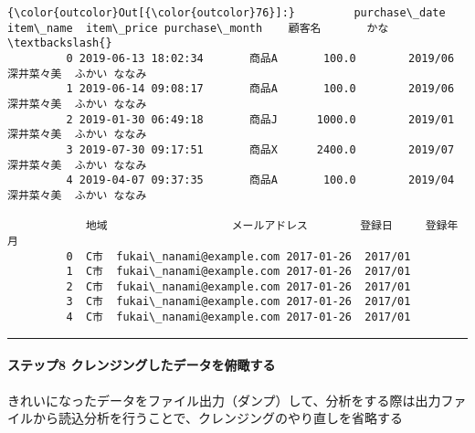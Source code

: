 \documentclass[11pt]{article}
\begin{document}
\begin{Verbatim}[commandchars=\\\{\}]
{\color{outcolor}Out[{\color{outcolor}76}]:}         purchase\_date item\_name  item\_price purchase\_month    顧客名       かな  \textbackslash{}
         0 2019-06-13 18:02:34       商品A       100.0        2019/06  深井菜々美  ふかい ななみ   
         1 2019-06-14 09:08:17       商品A       100.0        2019/06  深井菜々美  ふかい ななみ   
         2 2019-01-30 06:49:18       商品J      1000.0        2019/01  深井菜々美  ふかい ななみ   
         3 2019-07-30 09:17:51       商品X      2400.0        2019/07  深井菜々美  ふかい ななみ   
         4 2019-04-07 09:37:35       商品A       100.0        2019/04  深井菜々美  ふかい ななみ   
         
            地域                   メールアドレス        登録日     登録年月  
         0  C市  fukai\_nanami@example.com 2017-01-26  2017/01  
         1  C市  fukai\_nanami@example.com 2017-01-26  2017/01  
         2  C市  fukai\_nanami@example.com 2017-01-26  2017/01  
         3  C市  fukai\_nanami@example.com 2017-01-26  2017/01  
         4  C市  fukai\_nanami@example.com 2017-01-26  2017/01  
\end{Verbatim}
            
    \begin{center}\rule{0.5\linewidth}{\linethickness}\end{center}

    \paragraph{ステップ8
クレンジングしたデータを俯瞰する}\label{ux30b9ux30c6ux30c3ux30d78-ux30afux30ecux30f3ux30b8ux30f3ux30b0ux3057ux305fux30c7ux30fcux30bfux3092ux4fefux77b0ux3059ux308b}

きれいになったデータをファイル出力（ダンプ）して、分析をする際は出力ファイルから読込分析を行うことで、クレンジングのやり直しを省略する
\end{document}
